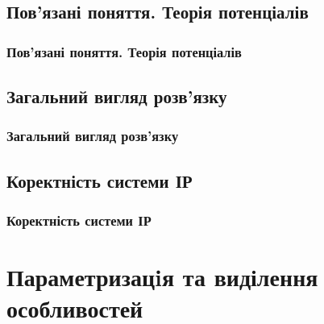 \documentclass{beamer}
\numberwithin{equation}{section}
\begin{document}
	\subsection{Пов'язані поняття. Теорія потенціалів}
	\begin{frame}
		\frametitle{Пов'язані поняття. Теорія потенціалів}
	\end{frame}

	\subsection{Загальний вигляд розв'язку}
	\begin{frame}
		\frametitle{Загальний вигляд розв'язку}
	\end{frame}

	\subsection{Коректність системи ІР}
	\begin{frame}
		\frametitle{Коректність системи ІР}
	\end{frame}
	

	\section{Параметризацiя та виділення особливостей} 
	
\end{document}
